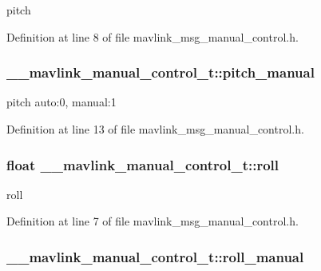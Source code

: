pitch 



Definition at line 8 of file mavlink\-\_\-msg\-\_\-manual\-\_\-control.\-h.

\hypertarget{struct____mavlink__manual__control__t_a64ad2133cc5e9f75044419f1253a1168}{
\subsubsection[{pitch\-\_\-manual}]{ \-\_\-\-\_\-mavlink\-\_\-manual\-\_\-control\-\_\-t\-::pitch\-\_\-manual}}\label{struct____mavlink__manual__control__t_a64ad2133cc5e9f75044419f1253a1168}


pitch auto\-:0, manual\-:1 



Definition at line 13 of file mavlink\-\_\-msg\-\_\-manual\-\_\-control.\-h.

\hypertarget{struct____mavlink__manual__control__t_aaca821a57d718f586cf655f5d1054cbb}{
\subsubsection[{roll}]{\setlength{\rightskip}{0pt plus 5cm}float \-\_\-\-\_\-mavlink\-\_\-manual\-\_\-control\-\_\-t\-::roll}}\label{struct____mavlink__manual__control__t_aaca821a57d718f586cf655f5d1054cbb}


roll 



Definition at line 7 of file mavlink\-\_\-msg\-\_\-manual\-\_\-control.\-h.

\hypertarget{struct____mavlink__manual__control__t_ab4a150b1bae53e055a2765476588c959}{
\subsubsection[{roll\-\_\-manual}]{ \-\_\-\-\_\-mavlink\-\_\-manual\-\_\-control\-\_\-t\-::roll\-\_\-manual}}\label{struct____mavlink__manual__control__t_ab4a150b1bae53e055a2765476588c959}


